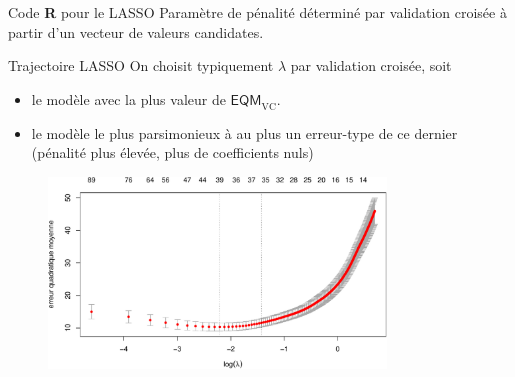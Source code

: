 \documentclass[
  ignorenonframetext,
]{beamer}
\newenvironment{Shaded}{\begin{snugshade}}{\end{snugshade}}
\newcommand{\AttributeTok}[1]{\textcolor[rgb]{0.40,0.45,0.13}{#1}}
\newcommand{\DecValTok}[1]{\textcolor[rgb]{0.68,0.00,0.00}{#1}}
\newcommand{\FloatTok}[1]{\textcolor[rgb]{0.68,0.00,0.00}{#1}}
\newcommand{\FunctionTok}[1]{\textcolor[rgb]{0.28,0.35,0.67}{#1}}
\newcommand{\NormalTok}[1]{\textcolor[rgb]{0.00,0.23,0.31}{#1}}
\newcommand{\OtherTok}[1]{\textcolor[rgb]{0.00,0.23,0.31}{#1}}
\newcommand{\SpecialCharTok}[1]{\textcolor[rgb]{0.37,0.37,0.37}{#1}}
\providecommand{\tightlist}{%
  \setlength{\itemsep}{0pt}\setlength{\parskip}{0pt}}\usepackage{longtable,booktabs,array}
\begin{document}
\begin{frame}[fragile]{Code \textbf{R} pour le LASSO}
\protect\hypertarget{code-r-pour-le-lasso}{}
Paramètre de pénalité déterminé par validation croisée à partir d'un
vecteur de valeurs candidates.

\begin{Shaded}
\end{Shaded}
\end{frame}

\begin{frame}{Trajectoire LASSO}
\protect\hypertarget{trajectoire-lasso}{}
On choisit typiquement \(\lambda\) par validation croisée, soit

\begin{itemize}
\tightlist
\item
  le modèle avec la plus valeur de \(\mathsf{EQM}_{\mathrm{VC}}\).
\item
  le modèle le plus parsimonieux à au plus un erreur-type de ce dernier
  (pénalité plus élevée, plus de coefficients nuls)
\end{itemize}

\begin{figure}

{\centering \includegraphics[width=0.8\textwidth,height=\textheight]{figures/fig-lassopath.pdf}

}

\end{figure}
\end{frame}
\end{document}
